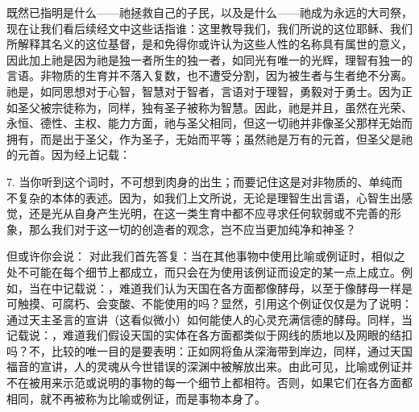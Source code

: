 既然已指明是什么——祂拯救自己的子民，以及是什么——祂成为永远的大司祭，现在让我们看后续经文中这些话指谁：这里教导我们，我们所说的这位耶稣、我们所解释其名义的这位基督，是和免得你或许认为这些人性的名称具有属世的意义，因此加上祂是因为祂是独一者所生的独一者，如同光有唯一的光辉，理智有独一的言语。非物质的生育并不落入复数，也不遭受分割，因为被生者与生者绝不分离。祂是，如同思想对于心智，智慧对于智者，言语对于理智，勇毅对于勇士。因为正如圣父被宗徒称为，同样，独有圣子被称为智慧。因此，祂是并且，虽然在光荣、永恒、德性、主权、能力方面，祂与圣父相同，但这一切祂并非像圣父那样无始而拥有，而是出于圣父，作为圣子，无始而平等；虽然祂是万有的元首，但圣父是祂的元首。因为经上记载：\par

7. 当你听到这个词时，不可想到肉身的出生；而要记住这是对非物质的、单纯而不复杂的本体的表述。因为，如我们上文所说，无论是理智生出言语，心智生出感觉，还是光从自身产生光明，在这一类生育中都不应寻求任何软弱或不完善的形象，那么我们对于这一切的创造者的观念，岂不应当更加纯净和神圣？\par

但或许你会说： 对此我们首先答复：当在其他事物中使用比喻或例证时，相似之处不可能在每个细节上都成立，而只会在为使用该例证而设定的某一点上成立。例如，当在中记载说：，难道我们认为天国在各方面都像酵母，以至于像酵母一样是可触摸、可腐朽、会变酸、不能使用的吗？显然，引用这个例证仅仅是为了说明：通过天主圣言的宣讲（这看似微小）如何能使人的心灵充满信德的酵母。同样，当记载说：，难道我们假设天国的实体在各方面都类似于网线的质地以及网眼的结扣吗？不，比较的唯一目的是要表明：正如网将鱼从深海带到岸边，同样，通过天国福音的宣讲，人的灵魂从今世错误的深渊中被解放出来。由此可见，比喻或例证并不在被用来示范或说明的事物的每一个细节上都相符。否则，如果它们在各方面都相同，就不再被称为比喻或例证，而是事物本身了。\par

